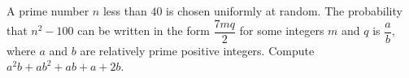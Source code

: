 A prime number $n$ less than $40$ is chosen uniformly at random. The probability that $n^2-100$ can be written in the form $\dfrac{7mq}{2}$ for some integers $m$ and $q$ is $\dfrac {a}{b}$, where $a$ and $b$ are relatively prime positive integers. Compute $a^2b+ab^2+ab+a+2b$.
